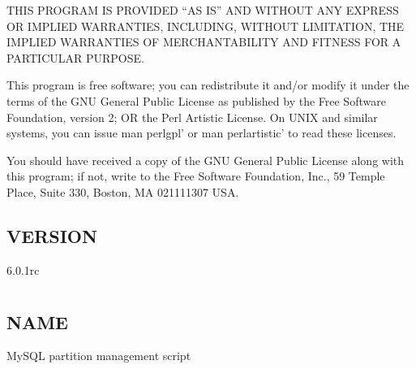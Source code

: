 \documentclass[letterpaper,10pt,english]{sphinxmanual}
\begin{document}
\sphinxAtStartPar
THIS PROGRAM IS PROVIDED “AS IS” AND WITHOUT ANY EXPRESS OR IMPLIED
WARRANTIES, INCLUDING, WITHOUT LIMITATION, THE IMPLIED WARRANTIES OF
MERCHANTABILITY AND FITNESS FOR A PARTICULAR PURPOSE.

\sphinxAtStartPar
This program is free software; you can redistribute it and/or modify it under
the terms of the GNU General Public License as published by the Free Software
Foundation, version 2; OR the Perl Artistic License.  On UNIX and similar
systems, you can issue \textasciigrave{}man perlgpl’ or \textasciigrave{}man perlartistic’ to read these
licenses.

\sphinxAtStartPar
You should have received a copy of the GNU General Public License along with
this program; if not, write to the Free Software Foundation, Inc., 59 Temple
Place, Suite 330, Boston, MA  02111\sphinxhyphen{}1307  USA.


\section{VERSION}
\label{\detokenize{mariadb-kill:version}}
\sphinxAtStartPar
{} 6.0.1rc


\chapter{}
\label{\detokenize{mariadb-parted:mariadb-parted}}\label{\detokenize{mariadb-parted::doc}}

\section{NAME}
\label{\detokenize{mariadb-parted:name}}
\sphinxAtStartPar
{} \sphinxhyphen{} MySQL partition management script
\end{document}
